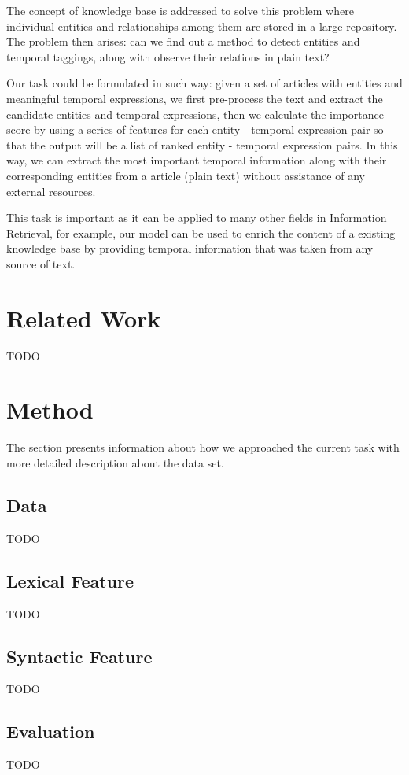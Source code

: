 \documentclass[11pt,a4paper]{article}
\begin{document}
The concept of knowledge base is addressed to solve this problem where individual entities and relationships among them are stored in a large repository. The problem then arises: can we find out a method to detect entities and temporal taggings, along with observe their relations in plain text? 

Our task could be formulated in such way: given a set of articles with entities and meaningful temporal expressions, we first pre-process the text and extract the candidate entities and temporal expressions, then we calculate the importance score by using a series of features for each entity - temporal expression pair so that the output will be a list of ranked entity - temporal expression pairs. In this way, we can extract the most important temporal information along with their corresponding entities from a article (plain text) without assistance of any external resources.

This task is important as it can be applied to many other fields in Information Retrieval, for example, our model can be used to enrich the content of a existing knowledge base by providing temporal information that was taken from any source of text. 


\section{Related Work}
TODO

\section{Method}
The section presents information about how we approached the current task with more detailed description about the data set. 

\subsection{Data}
TODO

\subsection{Lexical Feature}
TODO

\subsection{Syntactic Feature}
TODO


\subsection{Evaluation}
TODO
\end{document}
